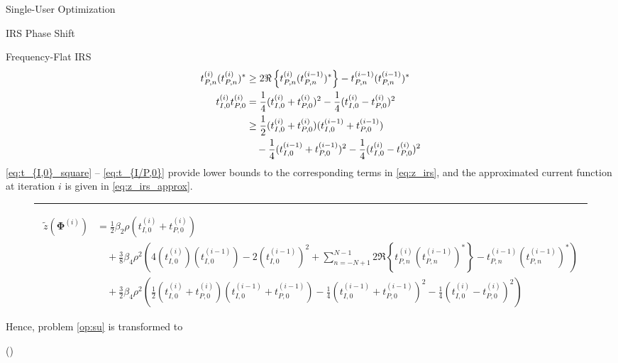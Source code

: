 \documentclass{IEEEtran}
\begin{document}
\begin{section}{Single-User Optimization}
\begin{subsection}{IRS Phase Shift}
\begin{subsubsection}{Frequency-Flat IRS}
\begin{align}
				t_{P,n}^{(i)} (t_{P,n}^{(i)})^*
				& \ge 2 \Re\left\{t_{P,n}^{(i)} (t_{P,n}^{(i-1)})^*\right\} - t_{P,n}^{(i-1)} (t_{P,n}^{(i-1)})^*\\
				t_{I,0}^{(i)} t_{P,0}^{(i)}
				& = \frac{1}{4}(t_{I,0}^{(i)} + t_{P,0}^{(i)})^2 - \frac{1}{4}(t_{I,0}^{(i)} - t_{P,0}^{(i)})^2\nonumber\\
				& \ge \frac{1}{2}(t_{I,0}^{(i)} + t_{P,0}^{(i)})(t_{I,0}^{(i-1)} + t_{P,0}^{(i-1)})\nonumber\\
				& \quad - \frac{1}{4}(t_{I,0}^{(i-1)} + t_{P,0}^{(i-1)})^2 - \frac{1}{4}(t_{I,0}^{(i)} - t_{P,0}^{(i)})^2\label{eq:t_{I/P,0}}
			\end{align}
			\ref{eq:t_{I,0}_square} -- \ref{eq:t_{I/P,0}} provide lower bounds to the corresponding terms in \ref{eq:z_irs}, and the approximated current function at iteration $i$ is given in \ref{eq:z_irs_approx}.
			\begin{figure*}[b]
				\hrule
				\begin{equation}\label{eq:z_irs_approx}
					\begin{split}
						\tilde{z}(\boldsymbol{\Phi}^{(i)})
						& = \frac{1}{2}{\beta_2}{\rho}(t_{I,0}^{(i)}+t_{P,0}^{(i)})\\
						& \quad + \frac{3}{8}{\beta_4}{\rho^2} \left(4 (t_{I,0}^{(i)})(t_{I,0}^{(i-1)}) - 2 (t_{I,0}^{(i-1)})^2 + \sum_{n=-N+1}^{N-1}{2 \Re\left\{t_{P,n}^{(i)} (t_{P,n}^{(i-1)})^*\right\} - t_{P,n}^{(i-1)} (t_{P,n}^{(i-1)})^*}\right)\\
						& \quad + \frac{3}{2}{\beta_4}{\rho^2} \left(\frac{1}{2}(t_{I,0}^{(i)} + t_{P,0}^{(i)})(t_{I,0}^{(i-1)} + t_{P,0}^{(i-1)}) - \frac{1}{4}(t_{I,0}^{(i-1)} + t_{P,0}^{(i-1)})^2 - \frac{1}{4}(t_{I,0}^{(i)} - t_{P,0}^{(i)})^2\right)
					\end{split}
				\end{equation}
			\end{figure*}
			Hence, problem \ref{op:su} is transformed to
			\begin{maxi!}
				{\boldsymbol{\boldsymbol{\Phi}}}{(\boldsymbol{\Phi})}{\label{op:su_irs}}{\label{eq:su_irs_target}}
			\end{maxi!}

\end{subsubsection}
\end{subsection}
\end{section}
\end{document}
